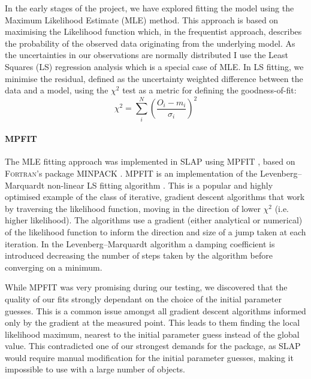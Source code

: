 In the early stages of the project, we have explored fitting the model using the Maximum Likelihood Estimate (MLE) method. This approach is based on maximising the Likelihood function which, in the frequentist approach, describes the probability of the observed data originating from the underlying model. As the uncertainties in our observations are normally distributed I use the Least Squares (LS) regression analysis which is a special case of MLE. In LS fitting, we minimise the residual, defined as the uncertainty weighted difference between the data and a model, using the $\chi^{2}$ test as a metric for defining the goodness-of-fit:
\begin{equation}
  \chi^2 = \sum\limits_i^N \left( \frac{O_i - m_i}{\sigma_i} \right)^2
\end{equation}

\paragraph{MPFIT} \label{sec:MPFIT}
The MLE fitting approach was implemented in \textsc{SLAP} using \textsc{MPFIT} \citep{ Markwardt2008}, based on \textsc{Fortran}'s package \textsc{MINPACK} \citep{More1980}. \textsc{MPFIT} is an implementation of the Levenberg–Marquardt non-linear LS fitting algorithm \citep{Levenberg1944,Marquardt1963}. This is a popular and highly optimised example of the class of iterative, gradient descent algorithms that work by traversing the likelihood function, moving in the direction of lower $\chi^2$ (i.e. higher likelihood). The algorithms use a gradient (either analytical or numerical) of the likelihood function to inform the direction and size of a jump taken at each iteration. In the Levenberg–Marquardt algorithm a damping coefficient is introduced decreasing the number of steps taken by the algorithm before converging on a minimum.

While \textsc{MPFIT} was very promising during our testing, we discovered that the quality of our fits strongly dependant on the choice of the initial parameter guesses. This is a common issue amongst all gradient descent algorithms informed only by the gradient at the measured point. This leads to them finding the local likelihood maximum, nearest to the initial parameter guess instead of the global value. This contradicted one of our strongest demands for the package, as \textsc{SLAP} would require manual modification for the initial parameter guesses, making it impossible to use with a large number of objects.

